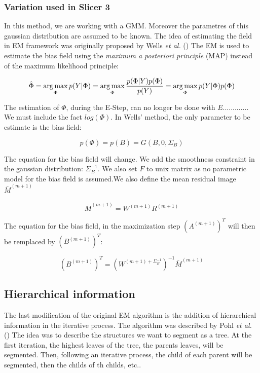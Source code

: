 \subsubsection{Variation used in Slicer 3}
In this method, we are working with a GMM. Moreover the parametres of this gaussian distribution are assumed to be known. The idea of estimating the field in EM framework was originally proposed by Wells \textit{et al.} (\cite{10}) The EM is used to estimate the bias field using the \textit{maximum a posteriori principle} (MAP) instead of the maximum likelihood principle:

  \begin{equation*}\label{MAP1}
  \hat{\Phi} =\operatorname*{arg\,max}_\Phi p(Y|\Phi)
             =\operatorname*{arg\,max}_\Phi \frac{p(\Phi|Y)p(\Phi)}{p(Y)}
             =\operatorname*{arg\,max}_\Phi p(Y|\Phi)p(\Phi)\\
  \end{equation*}

The estimation of $\Phi$, during the E-Step, can no longer be done with $E............$. We must include the fact $log(\Phi)$. In Wells' method, the only parameter to be estimate is the bias field:

  \begin{equation*}
  p(\Phi) = p(B) = G(B,0,\Sigma_B)
  \end{equation*}
  
The equation for the bias field will change. We add the smoothness constraint in the gaussian distribution: $\Sigma_B^{-1}$. We also set $F$ to unix matrix as no parametric model for the bias field is assumed.We also define the mean residual image $\bar{M}^{(m+1)}$

  \begin{equation*}
  \bar{M}^{(m+1)} = W^{(m+1)}R^{(m+1)}
  \end{equation*}

The equation for the bias field, in the maximization step $(A^{(m+1)})^T$ will then be remplaced by $(B^{(m+1)})^T$:

  \begin{equation*}
  (B^{(m+1)})^T = (W^{(m+1) + \Sigma_B^{-1}})^{-1}\bar{M}^{(m+1)}
  \end{equation*}

%
\subsection{Hierarchical information}
The last modification of the original EM algorithm is the addition of hierarchical information in the iterative process. The algorithm was described by Pohl \textit{et al.} (\cite{11}) The idea was to describe the structures we want to segment as a tree. At the first iteration, the highest leaves of the tree, the parents leaves, will be segmented. Then, following an iterative process, the child of each parent will be segmented, then the childs of th childs, etc..
  
